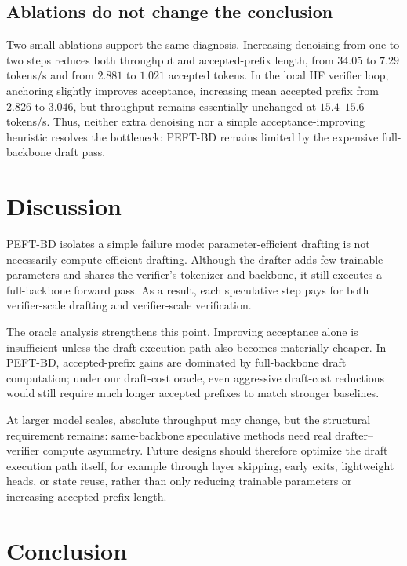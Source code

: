 \documentclass[11pt]{article}
\begin{document}
\subsection{Ablations do not change the conclusion}

Two small ablations support the same diagnosis. Increasing denoising from one to two steps reduces both throughput and accepted-prefix length, from $34.05$ to $7.29$ tokens/s and from $2.881$ to $1.021$ accepted tokens. In the local HF verifier loop, anchoring slightly improves acceptance, increasing mean accepted prefix from $2.826$ to $3.046$, but throughput remains essentially unchanged at $15.4$--$15.6$ tokens/s. Thus, neither extra denoising nor a simple acceptance-improving heuristic resolves the bottleneck: PEFT-BD remains limited by the expensive full-backbone draft pass.

\section{Discussion}

PEFT-BD isolates a simple failure mode: parameter-efficient drafting is not necessarily compute-efficient drafting. Although the drafter adds few trainable parameters and shares the verifier's tokenizer and backbone, it still executes a full-backbone forward pass. As a result, each speculative step pays for both verifier-scale drafting and verifier-scale verification.

The oracle analysis strengthens this point. Improving acceptance alone is insufficient unless the draft execution path also becomes materially cheaper. In PEFT-BD, accepted-prefix gains are dominated by full-backbone draft computation; under our draft-cost oracle, even aggressive draft-cost reductions would still require much longer accepted prefixes to match stronger baselines.

At larger model scales, absolute throughput may change, but the structural requirement remains: same-backbone speculative methods need real drafter--verifier compute asymmetry. Future designs should therefore optimize the draft execution path itself, for example through layer skipping, early exits, lightweight heads, or state reuse, rather than only reducing trainable parameters or increasing accepted-prefix length.


\section{Conclusion}
\end{document}
